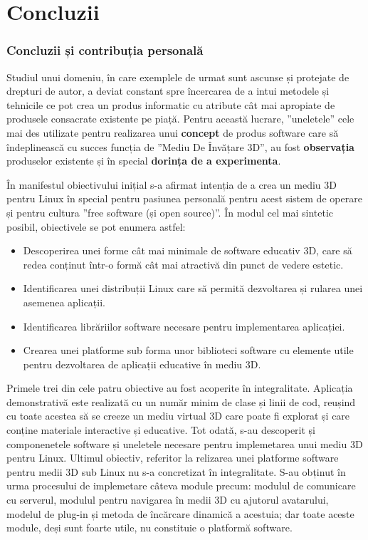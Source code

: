 \chapter{Concluzii}
\subsection{Concluzii și contribuția personală}
\par Studiul unui domeniu, în care exemplele de urmat sunt ascunse și protejate de drepturi de autor, a deviat constant spre încercarea de a intui metodele și tehnicile ce pot crea un produs informatic cu atribute cât mai apropiate de produsele consacrate existente pe piață. Pentru această lucrare, ”uneletele” cele mai des utilizate pentru realizarea unui \textbf{concept} de produs software care să îndeplinească cu succes funcția de ”Mediu De Învățare 3D”, au fost \textbf{observația}  produselor existente și în special \textbf{dorința de a experimenta}.
\par În manifestul obiectivului inițial s-a afirmat intenția de a crea un mediu 3D pentru Linux în special pentru pasiunea personală pentru acest sistem de operare și pentru cultura ”free software (și open source)”. În modul cel mai sintetic posibil, obiectivele se pot enumera astfel:

\begin{itemize}
\item Descoperirea unei forme cât mai minimale de software educativ 3D, care să redea conținut într-o formă cât mai atractivă din punct de vedere estetic.
\item Identificarea unei distribuții Linux care să permită dezvoltarea și rularea unei asemenea aplicații.
\item Identificarea librăriilor software necesare pentru implementarea aplicației.
\item Crearea unei platforme sub forma unor biblioteci software cu elemente utile pentru dezvoltarea de aplicații educative în mediu 3D.
\end{itemize}

\par Primele trei din cele patru obiective au fost acoperite în integralitate. Aplicația demonstrativă este realizată cu un număr minim de clase și linii de cod, reușind cu toate acestea să se creeze un mediu virtual 3D care poate fi explorat și care conține materiale interactive și educative. Tot odată, s-au descoperit și componenetele software și uneletele necesare pentru implemetarea unui mediu 3D pentru Linux. Ultimul obiectiv, referitor la relizarea unei platforme software pentru medii 3D sub Linux nu s-a concretizat în integralitate. S-au obținut în urma procesului de implemetare câteva module precum: modulul de comunicare cu serverul, modulul pentru navigarea în medii 3D cu ajutorul avatarului, modelul de plug-in și metoda de încărcare dinamică a acestuia; dar toate aceste module, deși sunt foarte utile, nu constituie o platformă software.

